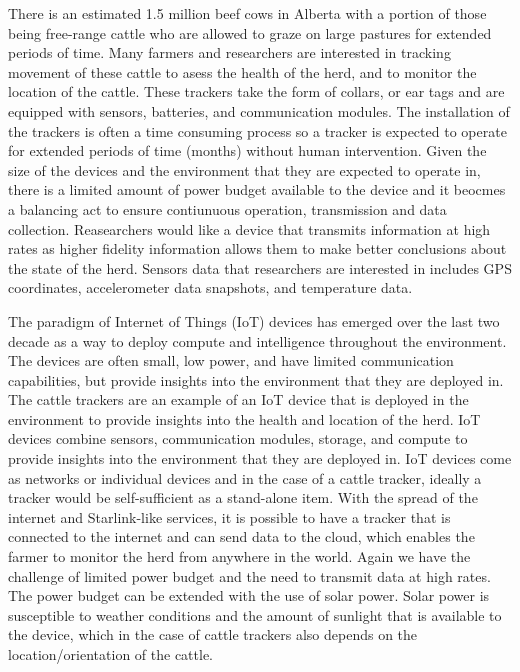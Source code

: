 \documentclass[10pt]{cai}
\begin{document}
There is an estimated 1.5 million beef cows in Alberta with a portion of those being free-range cattle who are allowed to graze on large pastures for extended periods of time.
Many farmers and researchers are interested in tracking movement of these cattle to asess the health of the herd, and to monitor the location of the cattle.
These trackers take the form of collars, or ear tags and are equipped with sensors, batteries, and communication modules.
The installation of the trackers is often a time consuming process so a tracker is expected to operate for extended periods of time (months) without human intervention.
Given the size of the devices and the environment that they are expected to operate in, there is a limited amount of power budget available to the device and it beocmes a balancing act to ensure contiunuous operation, transmission and data collection.
Reasearchers would like a device that transmits information at high rates as higher fidelity information allows them to make better conclusions about the state of the herd.
Sensors data that researchers are interested in includes GPS coordinates, accelerometer data snapshots, and temperature data.

The paradigm of Internet of Things (IoT) devices has emerged over the last two decade as a way to deploy compute and intelligence throughout the environment.
The devices are often small, low power, and have limited communication capabilities, but provide insights into the environment that they are deployed in.
The cattle trackers are an example of an IoT device that is deployed in the environment to provide insights into the health and location of the herd.
IoT devices combine sensors, communication modules, storage, and compute to provide insights into the environment that they are deployed in.
IoT devices come as networks or individual devices and in the case of a cattle tracker, ideally a tracker would be self-sufficient as a stand-alone item.
With the spread of the internet and Starlink-like services, it is possible to have a tracker that is connected to the internet and can send data to the cloud, which enables the farmer to monitor the herd from anywhere in the world.
Again we have the challenge of limited power budget and the need to transmit data at high rates.
The power budget can be extended with the use of solar power. 
Solar power is susceptible to weather conditions and the amount of sunlight that is available to the device, which in the case of cattle trackers also depends on the location/orientation of the cattle.
\end{document}
